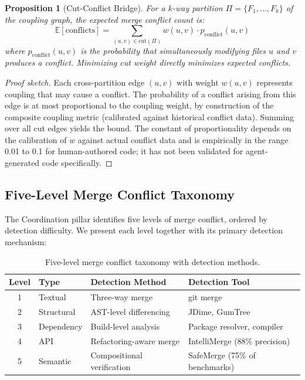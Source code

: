 \documentclass[11pt, a4paper, logo, copyright]{googledeepmind}
\newtheorem{proposition}{Proposition}[section]
\begin{document}
\begin{proposition}[Cut-Conflict Bridge]
\label{prop:cut-conflict}
For a $k$-way partition $\Pi = \{F_1, \ldots, F_k\}$ of the coupling graph, the expected merge conflict count is:
\begin{equation}
    \mathbb{E}[\text{conflicts}] = \sum_{(u,v) \in \text{cut}(\Pi)} w(u,v) \cdot p_{\text{conflict}}(u,v)
\end{equation}
where $p_{\text{conflict}}(u,v)$ is the probability that simultaneously modifying files $u$ and $v$ produces a conflict. Minimizing cut weight directly minimizes expected conflicts.
\end{proposition}

\begin{proof}[Proof sketch]
Each cross-partition edge $(u,v)$ with weight $w(u,v)$ represents coupling that may cause a conflict. The probability of a conflict arising from this edge is at most proportional to the coupling weight, by construction of the composite coupling metric (calibrated against historical conflict data). Summing over all cut edges yields the bound. The constant of proportionality depends on the calibration of $w$ against actual conflict data and is empirically in the range 0.01 to 0.1 for human-authored code; it has not been validated for agent-generated code specifically.
\end{proof}

\subsection{Five-Level Merge Conflict Taxonomy}

The Coordination pillar identifies five levels of merge conflict, ordered by detection difficulty. We present each level together with its primary detection mechanism:

\begin{table}[ht]
\centering
\caption{Five-level merge conflict taxonomy with detection methods.}
\label{tab:conflict-taxonomy}
\begin{tabular}{clll}
\toprule
\textbf{Level} & \textbf{Type} & \textbf{Detection Method} & \textbf{Detection Tool} \\
\midrule
1 & Textual & Three-way merge & git merge \\
2 & Structural & AST-level differencing & JDime, GumTree \\
3 & Dependency & Build-level analysis & Package resolver, compiler \\
4 & API & Refactoring-aware merge & IntelliMerge (88\% precision) \\
5 & Semantic & Compositional verification & SafeMerge (75\% of benchmarks) \\
\bottomrule
\end{tabular}
\end{table}
\end{document}
